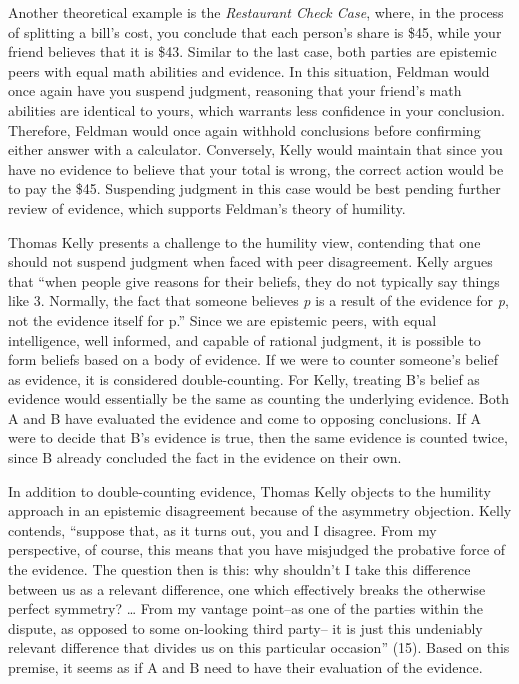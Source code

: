 \documentclass[12pt, a4paper, twoside]{article}
\begin{document}
Another theoretical example is the \emph{Restaurant Check Case}, where, in the process of splitting a bill’s cost, you conclude that each person’s share is \$45, while your friend believes that it is \$43. Similar to the last case, both parties are epistemic peers with equal math abilities and evidence. In this situation, Feldman would once again have you suspend judgment, reasoning that your friend’s math abilities are identical to yours, which warrants less confidence in your conclusion. Therefore, Feldman would once again withhold conclusions before confirming either answer with a calculator. Conversely, Kelly would maintain that since you have no evidence to believe that your total is wrong, the correct action would be to pay the \$45. Suspending judgment in this case would be best pending further review of evidence, which supports Feldman’s theory of humility. 

Thomas Kelly presents a challenge to the humility view, contending that one should not suspend judgment when faced with peer disagreement. Kelly argues that “when people give reasons for their beliefs, they do not typically say things like 3. Normally, the fact that someone believes \emph{p} is a result of the evidence for \emph{p}, not the evidence itself for p.” Since we are epistemic peers, with equal intelligence, well informed, and capable of rational judgment, it is possible to form beliefs based on a body of evidence. If we were to counter someone’s belief as evidence, it is considered double-counting. For Kelly, treating B’s belief as evidence would essentially be the same as counting the underlying evidence. Both A and B have evaluated the evidence and come to opposing conclusions. If A were to decide that B’s evidence is true, then the same evidence is counted twice, since B already concluded the fact in the evidence on their own.

In addition to double-counting evidence, Thomas Kelly objects to the humility approach in an epistemic disagreement because of the asymmetry objection. Kelly contends, “suppose that, as it turns out, you and I disagree. From my perspective, of course, this means that you have misjudged the probative force of the evidence. The question then is this: why shouldn’t I take this difference between us as a relevant difference, one which effectively breaks the otherwise perfect symmetry? … From my vantage point–as one of the parties within the dispute, as opposed to some on-looking third party– it is just this undeniably relevant difference that divides us on this particular occasion” (15). Based on this premise, it seems as if A and B need to have their evaluation of the evidence. 
\end{document}
